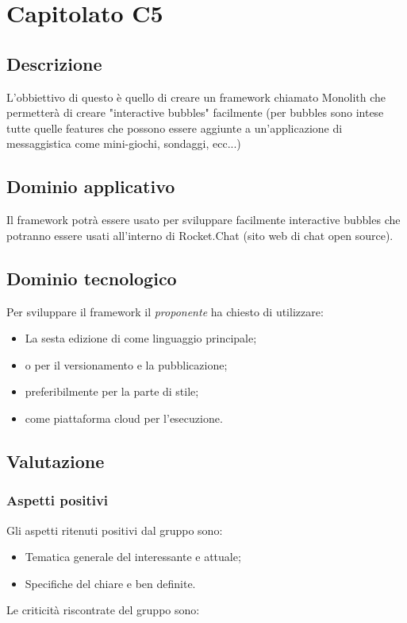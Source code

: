 \documentclass[../StudioDiFattibilita.tex]{subfiles}
\begin{document}
	\section{Capitolato C5}
		\subsection{Descrizione}
		L'obbiettivo di questo  è quello di creare un framework chiamato Monolith che permetterà di creare "interactive bubbles" facilmente (per bubbles sono intese tutte quelle features che possono essere aggiunte a un'applicazione di messaggistica come mini-giochi, sondaggi, ecc...)   
		\subsection{Dominio applicativo}
		Il framework potrà essere usato per sviluppare facilmente interactive bubbles che potranno essere usati all'interno di Rocket.Chat (sito web di chat open source).
		\subsection{Dominio tecnologico}
		Per sviluppare il framework il \textit{proponente} ha chiesto di utilizzare:
			\begin{itemize}
			\item La sesta edizione di  come linguaggio principale; 
			\item {} o  per il versionamento e la pubblicazione;
			\item {} preferibilmente per la parte di stile;
			\item {} come piattaforma cloud per l'esecuzione.
			\end{itemize}
		\subsection{Valutazione}
			\subsubsection{Aspetti positivi}
			Gli aspetti ritenuti positivi dal gruppo sono:
				\begin{itemize}
				\item Tematica generale del  interessante e attuale;
				\item Specifiche del  chiare e ben definite.
				\end{itemize}
			Le criticità riscontrate del gruppo sono:	
\end{document}
